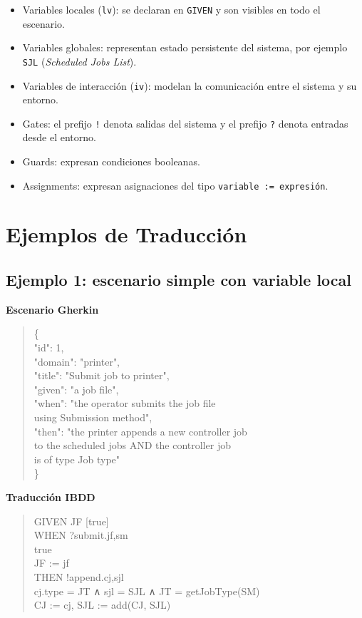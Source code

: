 \begin{itemize}
\item Variables locales (\texttt{lv}): se declaran en \texttt{GIVEN} y son visibles en todo el escenario.
\item Variables globales: representan estado persistente del sistema, por ejemplo \texttt{SJL} (\textit{Scheduled Jobs List}).
\item Variables de interacción (\texttt{iv}): modelan la comunicación entre el sistema y su entorno.
\item Gates: el prefijo \texttt{!} denota salidas del sistema y el prefijo \texttt{?} denota entradas desde el entorno.
\item Guards: expresan condiciones booleanas.
\item Assignments: expresan asignaciones del tipo \texttt{variable := expresión}.
\end{itemize}

\section{Ejemplos de Traducción}

\subsection{Ejemplo 1: escenario simple con variable local}

\textbf{Escenario Gherkin}

\begin{quote}
\ttfamily\small
\{\\
\quad "id": 1,\\
\quad "domain": "printer",\\
\quad "title": "Submit job to printer",\\
\quad "given": "a job file",\\
\quad "when": "the operator submits the job file\\
\quad using Submission method",\\
\quad "then": "the printer appends a new controller job\\
\quad to the scheduled jobs AND the controller job\\
\quad is of type Job type"\\
\}
\end{quote}

\textbf{Traducción IBDD}

\begin{quote}
\ttfamily\small
GIVEN JF [true]\\
WHEN ?submit.jf,sm\\
\quad true\\
\quad JF := jf\\
THEN !append.cj,sjl\\
\quad cj.type = JT ∧ sjl = SJL ∧ JT = getJobType(SM)\\
\quad CJ := cj, SJL := add(CJ, SJL)\\
\quad [is\_in\_list(CJ, SJL) ∧ CJ.type = JT]
\end{quote}

